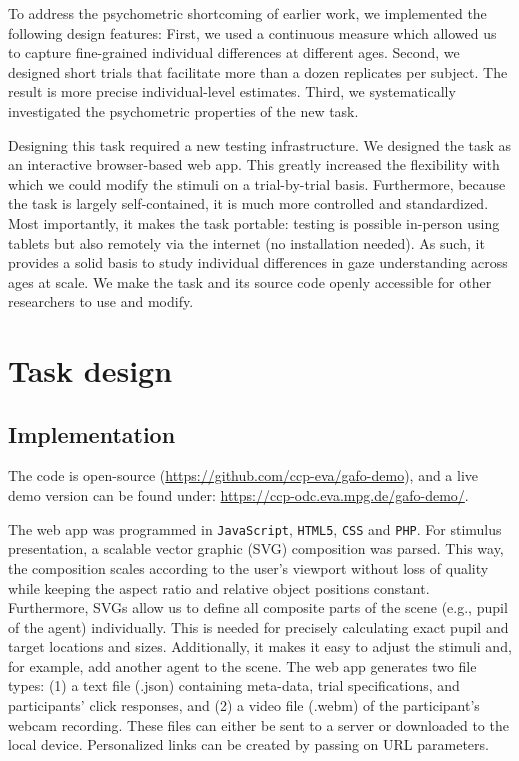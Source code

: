 \documentclass[
  man,floatsintext]{apa6}
\begin{document}
To address the psychometric shortcoming of earlier work, we implemented the following design features: First, we used a continuous measure which allowed us to capture fine-grained individual differences at different ages.
Second, we designed short trials that facilitate more than a dozen replicates per subject.
The result is more precise individual-level estimates.
Third, we systematically investigated the psychometric properties of the new task.

Designing this task required a new testing infrastructure.
We designed the task as an interactive browser-based web app.
This greatly increased the flexibility with which we could modify the stimuli on a trial-by-trial basis.
Furthermore, because the task is largely self-contained, it is much more controlled and standardized.
Most importantly, it makes the task portable: testing is possible in-person using tablets but also remotely via the internet (no installation needed).
As such, it provides a solid basis to study individual differences in gaze understanding across ages at scale.
We make the task and its source code openly accessible for other researchers to use and modify.

\hypertarget{task-design}{%
\section{Task design}\label{task-design}}

\hypertarget{implementation}{%
\subsection{Implementation}\label{implementation}}

The code is open-source (\url{https://github.com/ccp-eva/gafo-demo}), and a live demo version can be found under: \url{https://ccp-odc.eva.mpg.de/gafo-demo/}.

The web app was programmed in \texttt{JavaScript}, \texttt{HTML5}, \texttt{CSS} and \texttt{PHP}.
For stimulus presentation, a scalable vector graphic (SVG) composition was parsed.
This way, the composition scales according to the user's viewport without loss of quality while keeping the aspect ratio and relative object positions constant.
Furthermore, SVGs allow us to define all composite parts of the scene (e.g., pupil of the agent) individually.
This is needed for precisely calculating exact pupil and target locations and sizes.
Additionally, it makes it easy to adjust the stimuli and, for example, add another agent to the scene.
The web app generates two file types: (1) a text file (.json) containing meta-data, trial specifications, and participants' click responses, and (2) a video file (.webm) of the participant's webcam recording.
These files can either be sent to a server or downloaded to the local device.
Personalized links can be created by passing on URL parameters.
\end{document}
